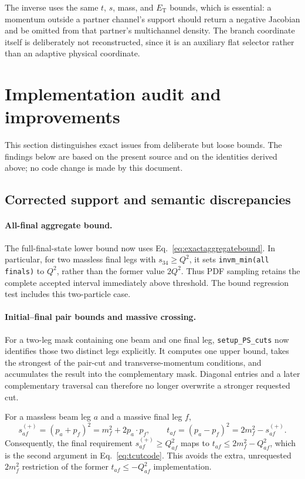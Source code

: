 \documentclass[11pt,a4paper]{article}
\newcommand{\code}[1]{\texttt{#1}}
\newcommand{\ET}{E_{\mathrm{T}}}
\begin{document}
The inverse uses the same $t$, $s$, mass, and $\ET$ bounds, which is essential:
a momentum outside a partner channel's support should return a negative
Jacobian and be omitted from that partner's multichannel density.  The branch
coordinate itself is deliberately not reconstructed, since it is an auxiliary
flat selector rather than an adaptive physical coordinate.

\section{Implementation audit and improvements}
\label{sec:audit}

This section distinguishes exact issues from deliberate but loose bounds.  The
findings below are based on the present source and on the identities derived
above; no code change is made by this document.

\subsection{Corrected support and semantic discrepancies}

\paragraph{All-final aggregate bound.}
The full-final-state lower bound now uses
Eq.~\eqref{eq:exactaggregatebound}.  In particular, for two massless final
legs with $s_{34}\geq Q^2$, it sets
\code{invm\_min(all finals)} to $Q^2$, rather than the former value $2Q^2$.
Thus PDF sampling retains the complete accepted interval immediately above
threshold.  The bound regression test includes this two-particle case.

\paragraph{Initial--final pair bounds and massive crossing.}
For a two-leg mask containing one beam and one final leg,
\code{setup\_PS\_cuts} now identifies those two distinct legs explicitly.
It computes one upper bound, takes the strongest of the pair-cut and
transverse-momentum conditions, and accumulates the result into the
complementary mask.  Diagonal entries and a later complementary traversal can
therefore no longer overwrite a stronger requested cut.

For a massless beam leg $a$ and a massive final leg $f$,
\begin{equation}
 s_{af}^{(+)}=(p_a+p_f)^2=m_f^2+2p_a\!\cdot p_f,
 \qquad t_{af}=(p_a-p_f)^2=2m_f^2-s_{af}^{(+)} .
 \label{eq:massivetrelation}
\end{equation}
Consequently, the final requirement $s_{af}^{(+)}\geq Q_{af}^2$ maps to
$t_{af}\leq2m_f^2-Q_{af}^2$, which is the second argument in
Eq.~\eqref{eq:tcutcode}.  This avoids the extra, unrequested $2m_f^2$
restriction of the former $t_{af}\leq-Q_{af}^2$ implementation.
\end{document}
